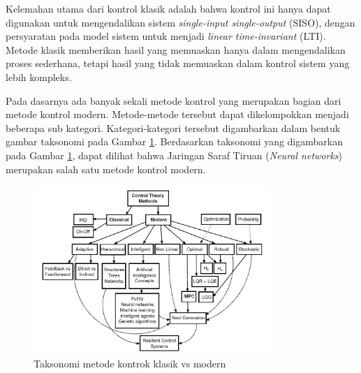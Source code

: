Kelemahan utama dari kontrol klasik adalah bahwa kontrol ini hanya dapat digunakan untuk mengendalikan sistem \textit{single-input single-output} (SISO), dengan persyaratan pada model sistem untuk menjadi \textit{linear time-invariant} (LTI). Metode klasik memberikan hasil yang memuaskan hanya dalam mengendalikan proses sederhana, tetapi hasil yang tidak memuaskan dalam kontrol sistem yang lebih kompleks. \cite{MPCDissertation}

Pada dasarnya ada banyak sekali metode kontrol yang merupakan bagian dari metode kontrol modern. Metode-metode tersebut dapat dikelompokkan menjadi beberapa sub kategori. Kategori-kategori tersebut digambarkan dalam bentuk gambar taksonomi pada Gambar \ref{fig:3:ControlSystemTaxonomy}. Berdasarkan taksonomi yang digambarkan pada Gambar \ref{fig:3:ControlSystemTaxonomy}, dapat dilihat bahwa Jaringan Saraf Tiruan (\textit{Neural networks}) merupakan salah satu metode kontrol modern.

\begin{figure}[!h]
	\centering
	\includegraphics[width=0.8\textwidth]{figures/ControlSystemTaxonomy}
	\caption{Taksonomi metode kontrok klasik vs modern \cite{MPCDissertation}}
	\label{fig:3:ControlSystemTaxonomy}
\end{figure}